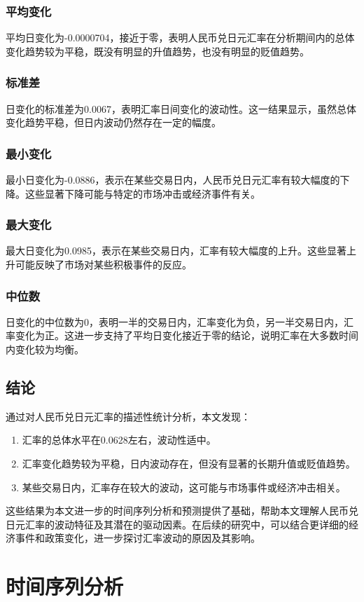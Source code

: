 \subsubsection{平均变化}
平均日变化为-0.0000704，接近于零，表明人民币兑日元汇率在分析期间内的总体变化趋势较为平稳，既没有明显的升值趋势，也没有明显的贬值趋势。
\subsubsection{标准差}
日变化的标准差为0.0067，表明汇率日间变化的波动性。这一结果显示，虽然总体变化趋势平稳，但日内波动仍然存在一定的幅度。
\subsubsection{最小变化}
最小日变化为-0.0886，表示在某些交易日内，人民币兑日元汇率有较大幅度的下降。这些显著下降可能与特定的市场冲击或经济事件有关。
\subsubsection{最大变化}
最大日变化为0.0985，表示在某些交易日内，汇率有较大幅度的上升。这些显著上升可能反映了市场对某些积极事件的反应。
\subsubsection{中位数}
日变化的中位数为0，表明一半的交易日内，汇率变化为负，另一半交易日内，汇率变化为正。这进一步支持了平均日变化接近于零的结论，说明汇率在大多数时间内变化较为均衡。
\subsection{结论}
通过对人民币兑日元汇率的描述性统计分析，本文发现：
\begin{enumerate}
  \item 汇率的总体水平在0.0628左右，波动性适中。
  \item 汇率变化趋势较为平稳，日内波动存在，但没有显著的长期升值或贬值趋势。
  \item 某些交易日内，汇率存在较大的波动，这可能与市场事件或经济冲击相关。
\end{enumerate}
这些结果为本文进一步的时间序列分析和预测提供了基础，帮助本文理解人民币兑日元汇率的波动特征及其潜在的驱动因素。在后续的研究中，可以结合更详细的经济事件和政策变化，进一步探讨汇率波动的原因及其影响。

\section{时间序列分析}
